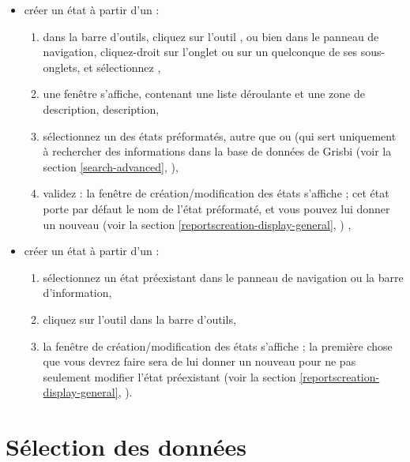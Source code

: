 \begin{itemize}
\newpage

 \item créer un état à partir d'un  :
    \begin{enumerate}
		\item dans la barre d'outils, cliquez sur l'outil , ou bien dans le panneau de navigation, cliquez-droit sur l'onglet  ou sur un quelconque de ses sous-onglets, et sélectionnez ,
		\item une fenêtre s'affiche, contenant une liste déroulante et une zone de \ifIllustration description, 
\else description,
\fi
		\item sélectionnez un des états préformatés, autre que  ou  (qui sert uniquement à rechercher des informations dans la base de données de Grisbi (voir la section \vref{search-advanced}, ),
		\item validez : la fenêtre de création/modification des états s'affiche ; cet état porte par défaut le nom de l'état préformaté, et vous pouvez lui donner un nouveau  (voir la section \vref{reportscreation-display-general}, ) ,
    \end{enumerate}

 \item créer un état à partir d'un  :
    \begin{enumerate}
		\item sélectionnez un état préexistant dans le panneau de navigation ou la barre d'information,
		\item cliquez sur l'outil  dans la barre d'outils,
		\item la fenêtre de création/modification des états s'affiche ; la première chose que vous devrez faire sera de lui donner un nouveau  pour ne pas seulement modifier l'état préexistant (voir la section \vref{reportscreation-display-general}, ). 
    \end{enumerate}
\end{itemize}


\section{Sélection des données\label{reportscreation-selection}}


